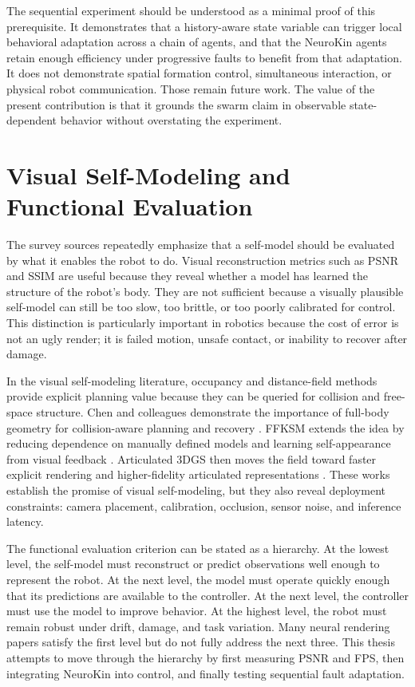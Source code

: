 \documentclass[12pt,a4paper,oneside]{report}
\begin{document}
The sequential experiment should be understood as a minimal proof of this prerequisite. It demonstrates that a history-aware state variable can trigger local behavioral adaptation across a chain of agents, and that the NeuroKin agents retain enough efficiency under progressive faults to benefit from that adaptation. It does not demonstrate spatial formation control, simultaneous interaction, or physical robot communication. Those remain future work. The value of the present contribution is that it grounds the swarm claim in observable state-dependent behavior without overstating the experiment.

\section{Visual Self-Modeling and Functional Evaluation}

The survey sources repeatedly emphasize that a self-model should be evaluated by what it enables the robot to do. Visual reconstruction metrics such as PSNR and SSIM are useful because they reveal whether a model has learned the structure of the robot's body. They are not sufficient because a visually plausible self-model can still be too slow, too brittle, or too poorly calibrated for control. This distinction is particularly important in robotics because the cost of error is not an ugly render; it is failed motion, unsafe contact, or inability to recover after damage.

In the visual self-modeling literature, occupancy and distance-field methods provide explicit planning value because they can be queried for collision and free-space structure. Chen and colleagues demonstrate the importance of full-body geometry for collision-aware planning and recovery \cite{chen2022full}. FFKSM extends the idea by reducing dependence on manually defined models and learning self-appearance from visual feedback \cite{hu2024teaching}. Articulated 3DGS then moves the field toward faster explicit rendering and higher-fidelity articulated representations \cite{hu2025learning}. These works establish the promise of visual self-modeling, but they also reveal deployment constraints: camera placement, calibration, occlusion, sensor noise, and inference latency.

The functional evaluation criterion can be stated as a hierarchy. At the lowest level, the self-model must reconstruct or predict observations well enough to represent the robot. At the next level, the model must operate quickly enough that its predictions are available to the controller. At the next level, the controller must use the model to improve behavior. At the highest level, the robot must remain robust under drift, damage, and task variation. Many neural rendering papers satisfy the first level but do not fully address the next three. This thesis attempts to move through the hierarchy by first measuring PSNR and FPS, then integrating NeuroKin into control, and finally testing sequential fault adaptation.
\end{document}
